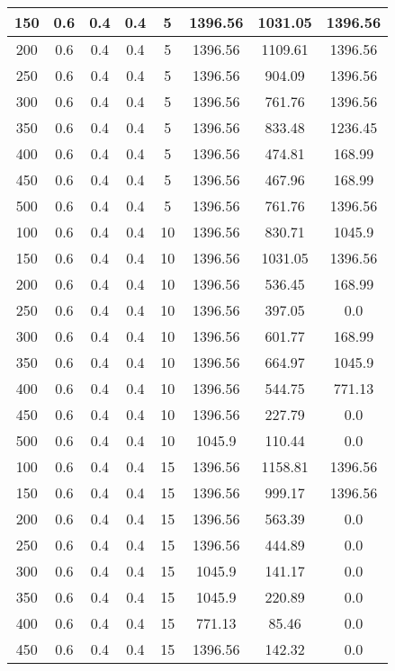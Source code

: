\documentclass[a4paper, 12pt]{extreport}
\begin{document}
\begin{itemize}
\begin{longtable}{|c|c|c|c|c|c|c|c|}
			150 & 0.6 & 0.4 & 0.4 & 5 & 1396.56 & 1031.05 & 1396.56 \\\hline
			200 & 0.6 & 0.4 & 0.4 & 5 & 1396.56 & 1109.61 & 1396.56 \\\hline
			250 & 0.6 & 0.4 & 0.4 & 5 & 1396.56 & 904.09 & 1396.56 \\\hline
			300 & 0.6 & 0.4 & 0.4 & 5 & 1396.56 & 761.76 & 1396.56 \\\hline
			350 & 0.6 & 0.4 & 0.4 & 5 & 1396.56 & 833.48 & 1236.45 \\\hline
			400 & 0.6 & 0.4 & 0.4 & 5 & 1396.56 & 474.81 & 168.99 \\\hline
			450 & 0.6 & 0.4 & 0.4 & 5 & 1396.56 & 467.96 & 168.99 \\\hline
			500 & 0.6 & 0.4 & 0.4 & 5 & 1396.56 & 761.76 & 1396.56 \\\hline
			100 & 0.6 & 0.4 & 0.4 & 10 & 1396.56 & 830.71 & 1045.9 \\\hline
			150 & 0.6 & 0.4 & 0.4 & 10 & 1396.56 & 1031.05 & 1396.56 \\\hline
			200 & 0.6 & 0.4 & 0.4 & 10 & 1396.56 & 536.45 & 168.99 \\\hline
			250 & 0.6 & 0.4 & 0.4 & 10 & 1396.56 & 397.05 & 0.0 \\\hline
			300 & 0.6 & 0.4 & 0.4 & 10 & 1396.56 & 601.77 & 168.99 \\\hline
			350 & 0.6 & 0.4 & 0.4 & 10 & 1396.56 & 664.97 & 1045.9 \\\hline
			400 & 0.6 & 0.4 & 0.4 & 10 & 1396.56 & 544.75 & 771.13 \\\hline
			450 & 0.6 & 0.4 & 0.4 & 10 & 1396.56 & 227.79 & 0.0 \\\hline
			500 & 0.6 & 0.4 & 0.4 & 10 & 1045.9 & 110.44 & 0.0 \\\hline
			100 & 0.6 & 0.4 & 0.4 & 15 & 1396.56 & 1158.81 & 1396.56 \\\hline
			150 & 0.6 & 0.4 & 0.4 & 15 & 1396.56 & 999.17 & 1396.56 \\\hline
			200 & 0.6 & 0.4 & 0.4 & 15 & 1396.56 & 563.39 & 0.0 \\\hline
			250 & 0.6 & 0.4 & 0.4 & 15 & 1396.56 & 444.89 & 0.0 \\\hline
			300 & 0.6 & 0.4 & 0.4 & 15 & 1045.9 & 141.17 & 0.0 \\\hline
			350 & 0.6 & 0.4 & 0.4 & 15 & 1045.9 & 220.89 & 0.0 \\\hline
			400 & 0.6 & 0.4 & 0.4 & 15 & 771.13 & 85.46 & 0.0 \\\hline
			450 & 0.6 & 0.4 & 0.4 & 15 & 1396.56 & 142.32 & 0.0 \\\hline

\end{longtable}
\end{itemize}
\end{document}
